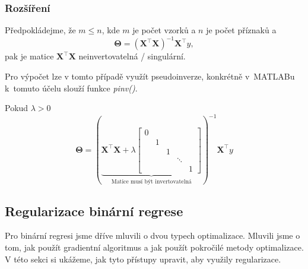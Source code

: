 \subsubsection*{Rozšíření}
\par{Předpokládejme, že $m \leq n$, kde $m$ je počet vzorků a $n$ je počet příznaků a 
\begin{equation}
	\bm{\Theta} = \left( \bm{X}^{\top} \bm{X} \right)^{-1} \bm{X}^{\top} y,
\end{equation}
pak je matice $\bm{X}^{\top} \bm{X} $ neinvertovatelná / singulární.}

\par{Pro výpočet lze v tomto případě využít pseudoinverze, konkrétně v~MATLABu k~tomuto účelu slouží funkce \textit{pinv()}.}


\par{Pokud $\lambda > 0$}
\begin{equation}
	\bm{\Theta} = \left( \underbrace{ \bm{X}^{\top} \bm{X} + \lambda 
	\left[ \begin{array}{ccccc}
		0 & ~ & ~ & ~ & ~\\
		~ & 1 & ~ & ~ & ~ \\
		~ & ~ & 1 & ~ & ~\\
		~ & ~ & ~ & \ddots & ~\\
		~ & ~ & ~ & ~ & 1
	\end{array} \right]}_{\text{Matice musí být invertovatelná}}  \right)^{-1} \bm{X}^{\top} y
\end{equation}

\newpage






















\subsection{Regularizace binární regrese}
\par{Pro binární regresi jsme dříve mluvili o dvou typech optimalizace. Mluvili jsme o tom, jak použít gradientní algoritmus a jak použít pokročilé metody optimalizace. V této sekci si ukážeme, jak tyto přístupy upravit, aby využily regularizace.}

